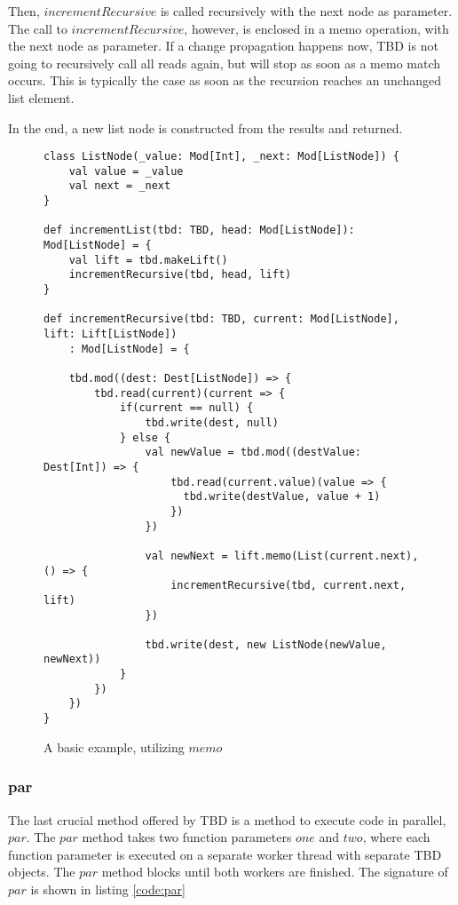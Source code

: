 Then, $incrementRecursive$ is called recursively with the next node as parameter. The call to $incrementRecursive$, however, is enclosed in a memo operation, with the next node as parameter. If a change propagation happens now, TBD is not going to recursively call all reads again, but will stop as soon as a memo match occurs. This is typically the case as soon as the recursion reaches an unchanged list element. 

In the end, a new list node is constructed from the results and returned. 
\begin{figure*}
\begin{lstlisting}[frame=single,basicstyle=\ttfamily]
class ListNode(_value: Mod[Int], _next: Mod[ListNode]) {
    val value = _value
    val next = _next
}

def incrementList(tbd: TBD, head: Mod[ListNode]): Mod[ListNode] = {
    val lift = tbd.makeLift()
    incrementRecursive(tbd, head, lift)
}

def incrementRecursive(tbd: TBD, current: Mod[ListNode], lift: Lift[ListNode])
    : Mod[ListNode] = {

    tbd.mod((dest: Dest[ListNode]) => {
        tbd.read(current)(current => {
            if(current == null) {
                tbd.write(dest, null)
            } else {
                val newValue = tbd.mod((destValue: Dest[Int]) => {
                    tbd.read(current.value)(value => {
                      tbd.write(destValue, value + 1)
                    })
                })

                val newNext = lift.memo(List(current.next), () => {
                    incrementRecursive(tbd, current.next, lift)
                })

                tbd.write(dest, new ListNode(newValue, newNext))
            } 
        })
    })
}

\end{lstlisting}
\caption{A basic example, utilizing $memo$}
\label{code:memoExample}
\end{figure*}

\subsubsection{par}
The last crucial method offered by TBD is a method to execute code in parallel, $par$. The $par$ method takes two function parameters $one$ and $two$, where each function parameter is executed on a separate worker thread with separate TBD objects. The $par$ method blocks until both workers are finished. The signature of $par$ is shown in listing \ref{code:par}


